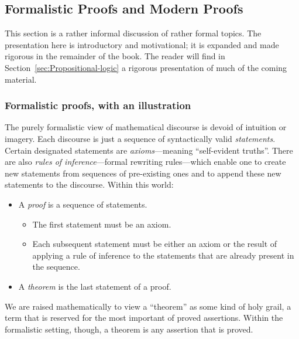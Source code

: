 \subsection{Formalistic Proofs and Modern Proofs}
\label{sec:classical-v-modern-proofs}

This section is a rather informal discussion of rather formal topics.
The presentation here is introductory and motivational; it is expanded
and made rigorous in the remainder of the book.  The reader will find
in Section~\ref{sec:Propositional-logic} a rigorous presentation of
much of the coming material.


\subsubsection{Formalistic proofs, with an illustration}
\label{sec:formal-proof}

The purely formalistic view of mathematical discourse is devoid of
intuition or imagery.  Each discourse is just a sequence of
syntactically valid {\it statements}.  Certain designated statements
are {\em axioms}---meaning ``self-evident truths''.  There are also
{\em rules of inference}---formal rewriting rules---which enable one
to create new statements from sequences of pre-existing ones and to
append these new statements to the discourse.  Within this world:
\begin{itemize}
\item
A {\em proof} is a sequence of statements.
  \begin{itemize}
  \item
The first statement must be an axiom.
  \item
Each subsequent statement must be either an axiom or the result of
applying a rule of inference to the statements that are already
present in the sequence.
  \end{itemize}
\item
A {\em theorem} is the last statement of a proof.
\end{itemize}
We are raised mathematically to view a ``theorem'' as some kind of
holy grail, a term that is reserved for the most important of proved
assertions.  Within the formalistic setting, though, a theorem is any
assertion that is proved.

\bigskip


